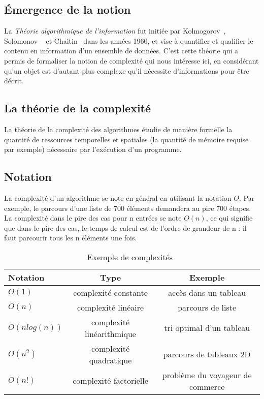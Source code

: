 \subsection{Émergence de la notion}
La \emph{Théorie algorithmique de l'information} fut initiée par Kolmogorov~\cite{ref.kol}, Solomonov%
~\cite{ref.sol} et Chaitin~\cite{ref.cha}
dans les années 1960, et vise à quantifier et qualifier le contenu en information d'un ensemble de données.
C'est cette théorie qui a permis de formaliser la notion de complexité qui nous intéresse ici,
en considérant qu'un objet est d'autant plus complexe qu'il nécessite d'informations pour être décrit.
\subsection{La théorie de la complexité}
La théorie de la complexité des algorithmes étudie de manière formelle la quantité de ressources
temporelles et spatiales (la quantité de mémoire requise par exemple) nécessaire
par l'exécution d'un programme.
\subsection{Notation} La complexité d'un algorithme se note en général en utilisant
la notation $O$.
Par exemple, le parcours d'une liste de 700 éléments demandera au pire 700 étapes.
La complexité dans le pire des cas pour n entrées se note $O(n)$, ce qui signifie que dans le pire
des cas, le temps de calcul est de l'ordre de grandeur de n : il faut parcourir tous les n
éléments une fois.

\begin{center}
    \begin{table}[h]
        \begin{tabular}{| l | c | c |}
            \hline
            Notation & Type & Exemple \\
            \hline
            $O(1)$ & complexité constante & accès dans un tableau\\
            $O(n)$ & complexité linéaire & parcours de liste\\
            $O(n log(n))$ & complexité linéarithmique & tri optimal d'un tableau\\
            $O(n^{2})$  & complexité quadratique & parcours de tableaux 2D\\
            $O(n!)$ & complexité factorielle & problème du voyageur de commerce\\
            \hline
        \end{tabular}
        \caption{Exemple de complexités~\cite{ref.table}}
    \end{table}
\end{center}


